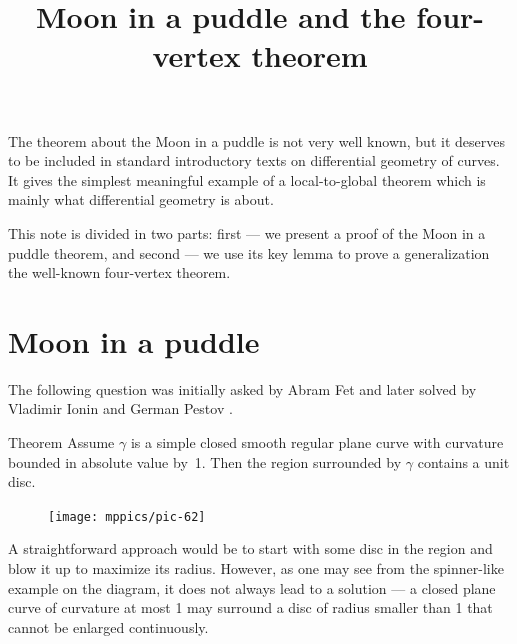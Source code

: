 \documentclass{article}
\begin{document}

\BgThispage

\title{Moon in a puddle and the four-vertex theorem}
\author{%
}
\date{}
\maketitle

\thispagestyle{empty}\newpage

The theorem about the Moon in a puddle is not very well known, but it deserves to be included in standard introductory texts on differential geometry of curves.
It gives the simplest meaningful example of a local-to-global theorem which is mainly what differential geometry is about.

This note is divided in two parts:  first --- we present a proof of the Moon in a puddle theorem, and second --- we use its key lemma to prove a generalization the well-known four-vertex theorem.


\section*{Moon in a puddle}

The following question was initially asked by Abram Fet and later solved by Vladimir Ionin and German Pestov \cite{pestov-ionin}.

\begin{thm}{Theorem}\label{thm:moon-orginal}
Assume $\gamma$ is a simple closed smooth regular plane curve with curvature bounded in absolute value by~1.
Then the region surrounded by $\gamma$ contains a unit disc.
\end{thm}


{

\begin{figure}
\vskip-6mm
\centering
\texttt{[image: mppics/pic-62]}
\vskip0mm
\end{figure}

A straightforward approach would be to start with some disc in the region and blow it up to maximize its radius.
However, as one may see from the spinner-like example on the diagram, it does not always lead to a solution --- a closed plane curve of curvature at most 1 may surround a disc of radius smaller than 1 that cannot be enlarged continuously.

}
\end{document}
